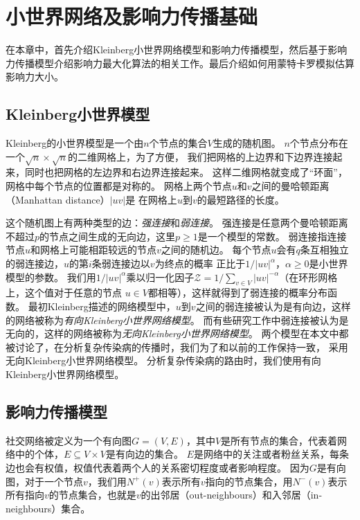 
\chapter{小世界网络及影响力传播基础}
在本章中，首先介绍Kleinberg小世界网络模型和影响力传播模型，然后基于影响力传播模型介绍影响力最大化算法的相关工作。最后介绍如何用蒙特卡罗模拟估算影响力大小。

\section{Kleinberg小世界模型}
Kleinberg的小世界模型是一个由$n$个节点的集合$V$生成的随机图。
$n$个节点分布在一个$\sqrt{n} \times \sqrt{n}$的二维网格上，为了方便，
我们把网格的上边界和下边界连接起来，同时也把网格的左边界和右边界连接起来。
这样二维网格就变成了“环面”，网格中每个节点的位置都是对称的。
网格上两个节点$u$和$v$之间的曼哈顿距离（Manhattan distance）$|uv|$是
在网格上$u$到$v$的最短路径的长度。

这个随机图上有两种类型的边：{\it 强连接}和{\it 弱连接}。
强连接是任意两个曼哈顿距离不超过$p$的节点之间生成的无向边，这里$p \geq 1$是一个模型的常数。
弱连接指连接节点$u$和网格上可能相距较远的节点$v$之间的随机边。
每个节点$u$会有$q$条互相独立的弱连接边，$u$的第$i$条弱连接边以$v$为终点的概率
正比于$1/{|uv|}^\alpha$，$\alpha\geq 0$是小世界模型的参数。
我们用$1/{|uv|}^\alpha$乘以归一化因子$\mathcal{Z} = 1/\sum_{v\in V}|uv|^{-\alpha}$（在环形网格上，这个值对于任意的节点 $u\in V$都相等），这样就得到了弱连接的概率分布函数。
最初Kleinberg描述的网络模型\cite{Kleinberg2000small}中，$u$到$v$之间的弱连接被认为是有向边，这样的网络被称为{\it 有向Kleinberg小世界网络模型}。
而有些研究工作\cite{Ghasemiesfeh2013complex}中弱连接被认为是无向的，这样的网络被称为{\it 无向Kleinberg小世界网络模型}。
两个模型在本文中都被讨论了，在分析复杂传染病的传播时，我们为了和以前的工作保持一致，
采用无向Kleinberg小世界网络模型。
分析复杂传染病的路由时，我们使用有向Kleinberg小世界网络模型。

\section{影响力传播模型}
社交网络被定义为一个有向图$G=(V,E)$，其中$V$是所有节点的集合，代表着网络中的个体，$E\subseteq V \times V$是有向边的集合。
$E$是网络中的关注或者粉丝关系，每条边也会有权值，权值代表着两个人的关系密切程度或者影响程度。
因为$G$是有向图，对于一个节点$v$，我们用$N^+(v)$表示所有$v$指向的节点集合，用$N^-(v)$表示所有指向$v$的节点集合，也就是$v$的出邻居（out-neighbours）和入邻居（in-neighbours）集合。

